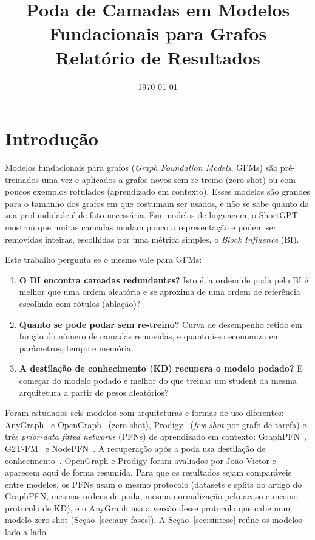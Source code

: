 \documentclass[12pt,a4paper]{article}
\title{Poda de Camadas em Modelos Fundacionais para Grafos\\
\large Relatório de Resultados}
\author{}
\date{\today}
\begin{document}
\maketitle
\tableofcontents
\newpage

\section{Introdução}

Modelos fundacionais para grafos (\emph{Graph Foundation Models}, GFMs) são pré-treinados uma vez e aplicados a grafos novos sem re-treino (zero-shot) ou com poucos exemplos rotulados (aprendizado em contexto). Esses modelos são grandes para o tamanho dos grafos em que costumam ser usados, e não se sabe quanto da sua profundidade é de fato necessária. Em modelos de linguagem, o ShortGPT~\cite{shortgpt} mostrou que muitas camadas mudam pouco a representação e podem ser removidas inteiras, escolhidas por uma métrica simples, o \emph{Block Influence} (BI).

Este trabalho pergunta se o mesmo vale para GFMs:
\begin{enumerate}
  \item \textbf{O BI encontra camadas redundantes?} Isto é, a ordem de poda pelo BI é melhor que uma ordem aleatória e se aproxima de uma ordem de referência escolhida com rótulos (ablação)?
  \item \textbf{Quanto se pode podar sem re-treino?} Curva de desempenho retido em função do número de camadas removidas, e quanto isso economiza em parâmetros, tempo e memória.
  \item \textbf{A destilação de conhecimento (KD) recupera o modelo podado?} E começar do modelo podado é melhor do que treinar um student da mesma arquitetura a partir de pesos aleatórios?
\end{enumerate}

Foram estudados seis modelos com arquiteturas e formas de uso diferentes: AnyGraph~\cite{anygraph} e OpenGraph~\cite{opengraph} (zero-shot), Prodigy~\cite{prodigy} (\emph{few-shot} por grafo de tarefa) e três \emph{prior-data fitted networks} (PFNs) de aprendizado em contexto: GraphPFN~\cite{graphpfn}, G2T-FM~\cite{g2tfm} e NodePFN~\cite{nodepfn}. A recuperação após a poda usa destilação de conhecimento~\cite{hinton-kd}. OpenGraph e Prodigy foram avaliados por João Victor e aparecem aqui de forma resumida. Para que os resultados sejam comparáveis entre modelos, os PFNs usam o mesmo protocolo (datasets e splits do artigo do GraphPFN, mesmas ordens de poda, mesma normalização pelo acaso e mesmo protocolo de KD), e o AnyGraph usa a versão desse protocolo que cabe num modelo zero-shot (Seção~\ref{sec:any-fases}). A Seção~\ref{sec:sintese} reúne os modelos lado a lado.
\end{document}

